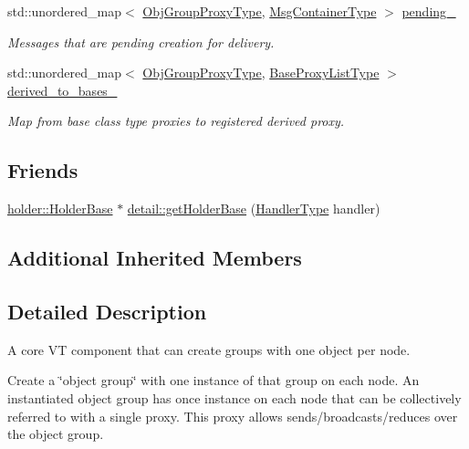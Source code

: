 \begin{DoxyCompactItemize}
std\+::unordered\+\_\+map$<$ \hyperlink{namespacevt_ad7cae989df485fccca57f0792a880a8e}{Obj\+Group\+Proxy\+Type}, \hyperlink{structvt_1_1objgroup_1_1_obj_group_manager_ab89e17bd301b2aa684fce22f0b4af30a}{Msg\+Container\+Type} $>$ \hyperlink{structvt_1_1objgroup_1_1_obj_group_manager_a0254917542e76ec489eb3c5ca6dcf0cd}{pending\+\_\+}
\begin{DoxyCompactList}\small\item\em Messages that are pending creation for delivery. \end{DoxyCompactList}\item 
std\+::unordered\+\_\+map$<$ \hyperlink{namespacevt_ad7cae989df485fccca57f0792a880a8e}{Obj\+Group\+Proxy\+Type}, \hyperlink{structvt_1_1objgroup_1_1_obj_group_manager_a497383a759f7426e824b4f7475b3d5d3}{Base\+Proxy\+List\+Type} $>$ \hyperlink{structvt_1_1objgroup_1_1_obj_group_manager_aee25f043f12ed4447af6974acc5aa4cf}{derived\+\_\+to\+\_\+bases\+\_\+}
\begin{DoxyCompactList}\small\item\em Map from base class type proxies to registered derived proxy. \end{DoxyCompactList}\end{DoxyCompactItemize}
\subsection*{Friends}
\begin{DoxyCompactItemize}
\item 
\hyperlink{structvt_1_1objgroup_1_1holder_1_1_holder_base}{holder\+::\+Holder\+Base} $\ast$ \hyperlink{structvt_1_1objgroup_1_1_obj_group_manager_a82fbcce71412249dde967ed026e172fe}{detail\+::get\+Holder\+Base} (\hyperlink{namespacevt_af64846b57dfcaf104da3ef6967917573}{Handler\+Type} handler)
\end{DoxyCompactItemize}
\subsection*{Additional Inherited Members}


\subsection{Detailed Description}
A core VT component that can create groups with one object per node. 

Create a \char`\"{}object group\char`\"{} with one instance of that group on each node. An instantiated object group has once instance on each node that can be collectively referred to with a single proxy. This proxy allows sends/broadcasts/reduces over the object group.

